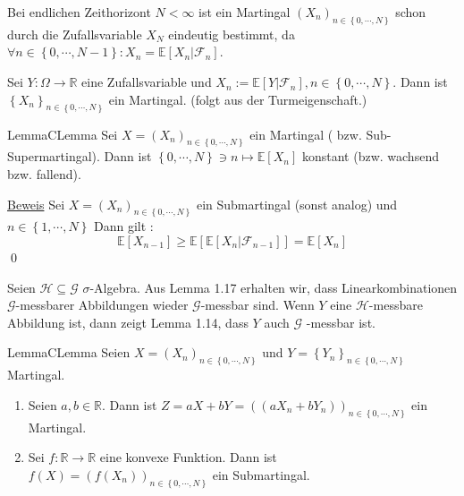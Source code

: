 Bei endlichen Zeithorizont $ N < \infty $ ist ein Martingal $ \left( X_n \right)_{n \in \left\{ 0 , \cdots, N \right\}} $ schon durch die Zufallsvariable $ X_{N} $ eindeutig bestimmt, da $ \forall n \in \left\{ 0 , \cdots, N-1 \right\}: X_n = \mathbb{E} \left[ X_n | \mathcal{F}_{n} \right] $. 

Sei $ Y : \Omega \to \mathbb{R} $ eine Zufallsvariable und $ X_n := \mathbb{E} \left[ Y | \mathcal{F}_{n} \right], n \in \left\{  0 , \cdots, N \right\} $. Dann ist $ \left\{ X_n \right\}_{n \in \left\{ 0 , \cdots, N \right\}} $ ein Martingal. (folgt aus der Turmeigenschaft.)

\begin{ibox}[4.7]{Lemma}{CLemma}
    Sei $     X =  \left( X_n \right)_{n \in \left\{ 0 , \cdots, N \right\}}   $ ein Martingal ( bzw. Sub- Supermartingal). Dann ist 
		$ \left\{ 0 , \cdots, N \right\} \ni  n \mapsto \mathbb{E} \left[ X_n \right] $ konstant (bzw. wachsend bzw. fallend).
\end{ibox}

\underline{Beweis} Sei $ X =  \left( X_n \right)_{n \in \left\{ 0 , \cdots, N \right\}} $ ein Submartingal (sonst analog) und $  n \in \left\{ 1 , \cdots, N \right\} $ Dann gilt :
$$ \mathbb{E} \left[ X_{n-1} \right] \geq \mathbb{E} \left[ \mathbb{E} \left[ X_n | \mathcal{F}_{n-1} \right] \right] = \mathbb{E} \left[ X_n \right] $$ \qed

Seien $ \mathcal{H} \subseteq \mathcal{G} $ $\sigma$-Algebra. Aus Lemma 1.17 erhalten wir, dass Linearkombinationen $ \mathcal{G} $-messbarer Abbildungen wieder $ \mathcal{G} $-messbar sind. Wenn $ Y  $ eine $ \mathcal{H} $-messbare Abbildung ist, dann zeigt Lemma 1.14, dass 
$ Y $ auch $ \mathcal{G} $ -messbar ist.

\begin{ibox}[4.9]{Lemma}{CLemma}
    Seien $X =  \left( X_n \right)_{n \in \left\{ 0 , \cdots, N \right\}} $ und $ Y = \left\{ Y_n \right\}_{n \in \left\{ 0 , \cdots, N \right\}} $ Martingal.
		\begin{enumerate}[label=\alph*)]
			\item Seien $ a, b \in \mathbb{R} $. Dann ist $ Z = aX + bY = \left( \left( aX_n + bY_n \right) \right)_{n \in \left\{ 0 , \cdots, N \right\}}$ ein Martingal.
			\item Sei $ f : \mathbb{R} \to \mathbb{R} $ eine konvexe Funktion. Dann ist $ f (X) = \left( f (X_n) \right)_{n \in \left\{ 0 , \cdots,  N \right\}} $ ein Submartingal.
		\end{enumerate}
\end{ibox}

